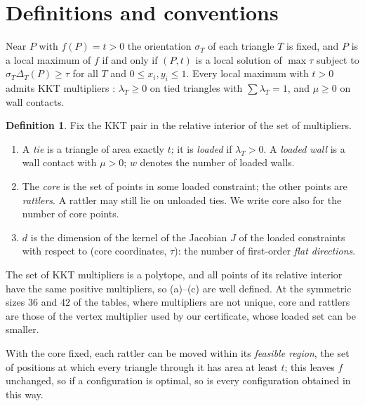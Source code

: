 \documentclass[11pt]{amsart}
\theoremstyle{definition}
\newtheorem{definition}[theorem]{Definition}
\newcommand{\core}{\mathrm{core}}
\begin{document}
\section{Definitions and conventions}\label{sec:defs}

Near $P$ with $f(P) = t > 0$ the orientation $\sigma_T$ of each triangle $T$ is fixed, and $P$ is a local maximum of $f$ if and only if $(P,t)$ is a local solution of $\max \tau$ subject to $\sigma_T\Delta_T(P) \ge \tau$ for all $T$ and $0 \le x_i,y_i \le 1$. Every local maximum with $t > 0$ admits KKT multipliers \cite[Thm.~2.3]{Trela}: $\lambda_T \ge 0$ on tied triangles with $\sum\lambda_T = 1$, and $\mu \ge 0$ on wall contacts. %

\begin{definition}
Fix the KKT pair in the relative interior of the set of multipliers.
\begin{enumerate}[label=(\alph*)]
\item A \emph{tie} is a triangle of area exactly $t$; it is \emph{loaded} if $\lambda_T > 0$. A \emph{loaded wall} is a wall contact with $\mu > 0$; $w$ denotes the number of loaded walls.
\item The \emph{core} is the set of points in some loaded constraint; the other points are \emph{rattlers}. A rattler may still lie on unloaded ties. We write $\core$ also for the number of core points.
\item $d$ is the dimension of the kernel of the Jacobian $J$ of the loaded constraints with respect to (core coordinates, $\tau$): the number of first-order \emph{flat directions}.
\end{enumerate}
The set of KKT multipliers is a polytope, and all points of its relative interior have the same positive multipliers, so (a)--(c) are well defined. At the symmetric sizes $36$ and $42$ of the tables, where multipliers are not unique, core and rattlers are those of the vertex multiplier used by our certificate, whose loaded set can be smaller.
\end{definition}

With the core fixed, each rattler can be moved within its \emph{feasible region}, the set of positions at which every triangle through it has area at least $t$; this leaves $f$ unchanged, so if a configuration is optimal, so is every configuration obtained in this way.
\end{document}
